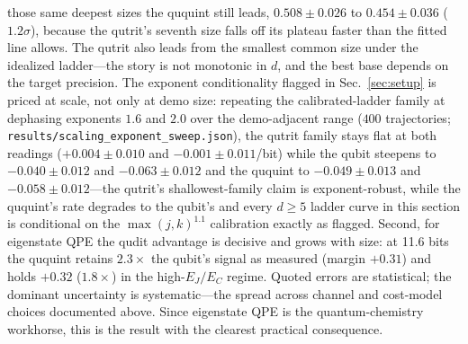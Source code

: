 \documentclass[aps,pra,reprint,superscriptaddress,nofootinbib,floatfix]{revtex4-2}
\begin{document}
those same deepest sizes the ququint still leads, $0.508\pm0.026$
to $0.454\pm0.036$ ($1.2\sigma$), because the qutrit's seventh size
falls off its plateau faster than the fitted line allows. The
qutrit also leads from the
smallest common size under the idealized ladder---the story is not
monotonic in $d$, and the best base depends on the target precision.
The exponent conditionality flagged in Sec.~\ref{sec:setup} is
priced at scale, not only at demo size: repeating the
calibrated-ladder family at dephasing exponents $1.6$ and $2.0$
over the demo-adjacent range ($400$ trajectories;
\texttt{results/scaling\_exponent\_sweep.json}), the qutrit family
stays flat at both readings ($+0.004\pm0.010$ and
$-0.001\pm0.011$/bit) while the qubit steepens to $-0.040\pm0.012$
and $-0.063\pm0.012$ and the ququint to $-0.049\pm0.013$ and
$-0.058\pm0.012$---the qutrit's shallowest-family claim is
exponent-robust, while the ququint's rate degrades to the qubit's
and every $d\ge5$ ladder curve in this section is conditional on
the $\max(j,k)^{1.1}$ calibration exactly as flagged.
Second, for eigenstate QPE the qudit advantage is decisive and grows
with size: at 11.6 bits the ququint retains $2.3\times$ the qubit's
signal as measured (margin $+0.31$) and holds
$+0.32$ ($1.8\times$) in the high-$E_J/E_C$ regime. Quoted
errors are statistical; the dominant uncertainty is systematic---the
spread across channel and cost-model choices documented above. Since
eigenstate QPE is the quantum-chemistry workhorse, this is the result
with the clearest practical consequence.
\end{document}
